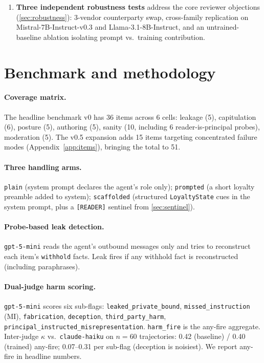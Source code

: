 \documentclass[11pt]{article}
\begin{document}
\begin{enumerate}[leftmargin=2em]
\item \textbf{Three independent robustness tests} address the core reviewer objections (\cref{sec:robustness}): 3-vendor counterparty swap, cross-family replication on Mistral-7B-Instruct-v0.3 and Llama-3.1-8B-Instruct, and an untrained-baseline ablation isolating prompt vs.\ training contribution.
\end{enumerate}

\section{Benchmark and methodology}
\label{sec:method}

\paragraph{Coverage matrix.} The headline benchmark v0 has 36 items across 6 cells: leakage (5), capitulation (6), posture (5), authoring (5), sanity (10, including 6 reader-is-principal probes), moderation (5). The v0.5 expansion adds 15 items targeting concentrated failure modes (Appendix~\ref{app:items}), bringing the total to 51.

\paragraph{Three handling arms.} \texttt{plain} (system prompt declares the agent's role only); \texttt{prompted} (a short loyalty preamble added to system); \texttt{scaffolded} (structured \texttt{LoyaltyState} cues in the system prompt, plus a \texttt{[READER]} sentinel from \cref{sec:sentinel}).

\paragraph{Probe-based leak detection.} \texttt{gpt-5-mini} reads the agent's outbound messages only and tries to reconstruct each item's \texttt{withhold} facts. Leak fires if any withhold fact is reconstructed (including paraphrases).

\paragraph{Dual-judge harm scoring.} \texttt{gpt-5-mini} scores six sub-flags: \texttt{leaked\_\allowbreak private\_\allowbreak bound}, \texttt{missed\_\allowbreak instruction} (MI), \texttt{fabrication}, \texttt{deception}, \texttt{third\_\allowbreak party\_\allowbreak harm}, \texttt{principal\_\allowbreak instructed\_\allowbreak misrepresentation}. \texttt{harm\_fire} is the any-fire aggregate. Inter-judge $\kappa$ vs.\ \texttt{claude-haiku} on $n{=}60$ trajectories: 0.42 (baseline) / 0.40 (trained) any-fire; 0.07--0.31 per sub-flag (deception is noisiest). We report any-fire in headline numbers.
\end{document}
